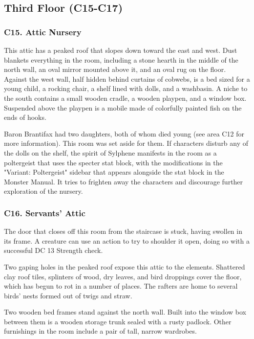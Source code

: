 \documentclass[10pt,a4paper,twoside,bg=print,twocolumn,openany,nodeprecatedcode]{dndbook}
\begin{document}
\subsection{Third Floor (C15-C17)}
\subsubsection{C15. Attic Nursery}
\begin{DndReadAloud}{}
This attic has a peaked roof that slopes down toward the east and west. Dust blankets everything in the room, including a stone hearth in the middle of the north wall, an oval mirror mounted above it, and an oval rug on the floor. Against the west wall, half hidden behind curtains of cobwebs, is a bed sized for a young child, a rocking chair, a shelf lined with dolls, and a washbasin. A niche to the south contains a small wooden cradle, a wooden playpen, and a window box. Suspended above the playpen is a mobile made of colorfully painted fish on the ends of hooks. 

\end{DndReadAloud}

Baron Brantifax had two daughters, both of whom died young (see area C12 for more information). This room was set aside for them. If characters disturb any of the dolls on the shelf, the spirit of Sylphene manifests in the room as a poltergeist that uses the specter stat block, with the modifications in the "Variant: Poltergeist" sidebar that appears alongside the stat block in the Monster Manual. It tries to frighten away the characters and discourage further exploration of the nursery.

\subsubsection{C16. Servants' Attic}
The door that closes off this room from the staircase is stuck, having swollen in its frame. A creature can use an action to try to shoulder it open, doing so with a successful DC 13 Strength check.

\begin{DndReadAloud}{}
Two gaping holes in the peaked roof expose this attic to the elements. Shattered clay roof tiles, splinters of wood, dry leaves, and bird droppings cover the floor, which has begun to rot in a number of places. The rafters are home to several birds' nests formed out of twigs and straw.

Two wooden bed frames stand against the north wall. Built into the window box between them is a wooden storage trunk sealed with a rusty padlock. Other furnishings in the room include a pair of tall, narrow wardrobes. 

\end{DndReadAloud}
\end{document}
